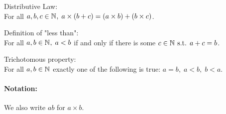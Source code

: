 \documentclass[MathsNotesBase.tex]{subfiles}
\begin{document}
{				\begin{axiom}{Distributive Law:}\\ For all $a,b,c \in \mathbb{N}^{},\; a \times (b + c) = (a \times b) + (b \times c)$.
				\end{axiom}
				\begin{axiom}{Definition of "less than":}\\ For all $a,b \in \mathbb{N}^{},\; a < b$ if and only if there is some $c \in \mathbb{N}^{} \text{ s.t. } a + c = b$.
				\end{axiom}
				\begin{axiom}{Trichotomous property:}\\ For all $a,b \in \mathbb{N}^{}$ exactly one of the following is true: $a = b,\; a < b,\; b < a$.
				\end{axiom}
			}
		
		\paragraph{Notation:} We also write $ab$ for $a \times b$.
		
\end{document}
